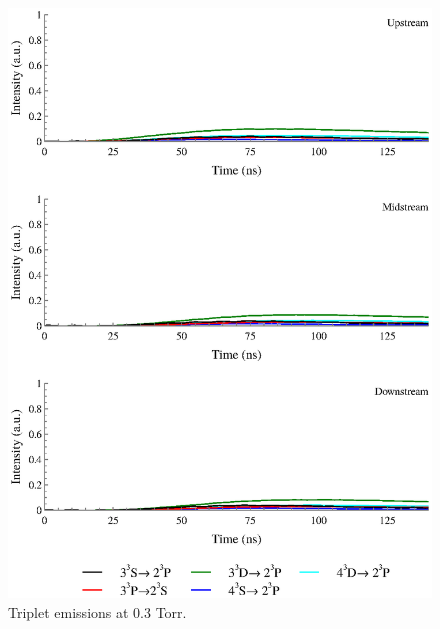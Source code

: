 \begin{figure}
  \centering
  \includegraphics{./chapters/extraem/figures/03torr_t.eps}
  \caption{Triplet emissions at 0.3 Torr.}
\end{figure}

